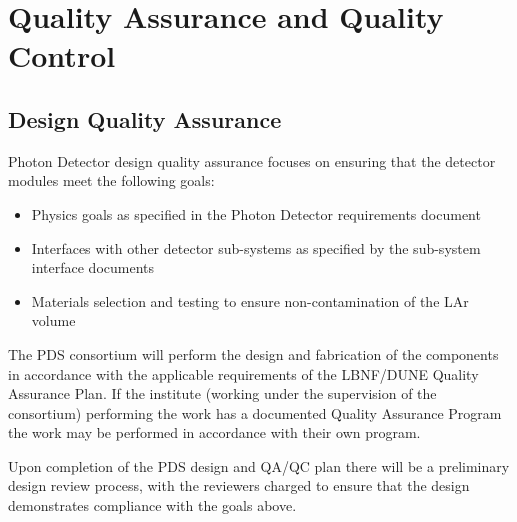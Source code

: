 \section{Quality Assurance and Quality Control}
\label{sec:fdsp-pd-qaqc}




\subsection{Design Quality Assurance}
\label{sec:fdsp-pd-designqa}

Photon Detector design quality assurance focuses on ensuring that the detector modules meet the following goals:
\begin{itemize}
\item Physics goals as specified in the Photon Detector requirements document
\item Interfaces with other detector sub-systems as specified by the sub-system interface documents
\item Materials selection and testing to ensure non-contamination of the LAr volume
\end{itemize}

The PDS consortium will perform the design and fabrication of the components in accordance with the applicable requirements of the LBNF/DUNE Quality Assurance Plan. If the institute (working under the supervision of the consortium) performing the work has a documented Quality Assurance Program the work may be performed in accordance with their own program.

Upon completion of the PDS design and QA/QC plan there will be a preliminary design review process, with the reviewers charged to ensure that the design demonstrates compliance with the goals above.

